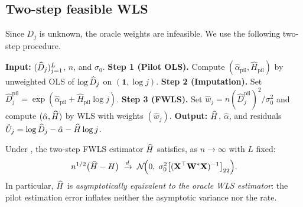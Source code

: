 \subsection{Two-step feasible WLS}

Since $D_j$ is unknown, the oracle weights are infeasible. We use the
following two-step procedure.

\begin{algorithm}[H]
\caption{Two-Step FWLS Estimator}\label{alg:fwls}
\begin{algorithmic}[1]
\State \textbf{Input:} $(\widehat{D}_j)_{j=1}^L$, $n$, and $\sigma_0$.
\State \textbf{Step 1 (Pilot OLS).} Compute $(\hat\alpha_{\mathrm{pil}}, \hat H_{\mathrm{pil}})$ by unweighted OLS of $\log \widehat{D}_j$ on $(\mathbf{1}, \log j)$.
\State \textbf{Step 2 (Imputation).} Set $\hat D_j^{\mathrm{pil}} = \exp(\hat\alpha_{\mathrm{pil}} + \hat H_{\mathrm{pil}} \log j)$.
\State \textbf{Step 3 (FWLS).} Set $\hat w_j = n (\hat D_j^{\mathrm{pil}})^2 / \sigma_0^2$ and compute $(\hat\alpha, \widehat{H})$ by WLS with weights $(\hat w_j)$.
\State \textbf{Output:} $\widehat{H}$, $\hat\alpha$, and residuals $\hat U_j = \log \widehat{D}_j - \hat\alpha - \widehat{H} \log j$.
\end{algorithmic}
\end{algorithm}

\begin{theorem}
\label{thm:clt-fwls}
Under , the two-step FWLS estimator
$\widehat{H}$ satisfies, as $n \to \infty$ with $L$ fixed:
\begin{equation}
    n^{1/2}\bigl(\widehat{H} - H\bigr) \;\xrightarrow{d}\;
    \mathcal{N}\!\Bigl(0,\; \sigma_0^2
    \bigl[(\mathbf{X}^\top \mathbf{W}^* \mathbf{X})^{-1}\bigr]_{22}\Bigr).
    \label{eq:fwls-clt}
\end{equation}
In particular, $\widehat{H}$ is \emph{asymptotically equivalent to the oracle
WLS estimator}: the pilot estimation error inflates neither the asymptotic
variance nor the rate.
\end{theorem}

